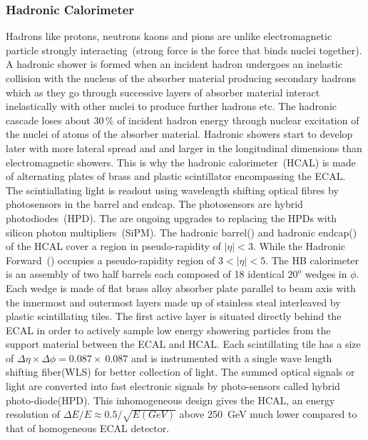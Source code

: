  



\subsubsection{Hadronic Calorimeter}
Hadrons like protons, neutrons kaons and pions are unlike electromagnetic particle strongly interacting~(strong force is the force that binds nuclei together). A hadronic shower is formed when an incident hadron undergoes an inelastic collision with the nucleus of the absorber material producing secondary hadrons which as they go through successive layers of absorber material interact inelastically with other nuclei to produce further hadrons etc. 
The  hadronic cascade loses about 30\,\% of incident hadron energy through nuclear excitation of the nuclei of atoms of the  absorber material.  Hadronic showers start to develop later with more lateral spread and and larger in the longitudinal dimensions than electromagnetic showers. This is why the hadronic calorimeter~(HCAL) is made of alternating plates of brass and plastic scintillator encompassing the ECAL. The scintiallating light is readout using wavelength shifting optical fibres by photosensors in the barrel and endcap. The photosensors are hybrid photodiodes~(HPD). The are ongoing upgrades to replacing the HPDs with silicon photon multipliers~(SiPM). 
The  hadronic barrel() and hadronic endcap() of the HCAL cover a region in pseudo-rapidity of $\vert \eta \vert < 3$. While the Hadronic Forward~() occupies a pseudo-rapidity region of $3 < \vert \eta \vert < 5$.
The HB calorimeter is an assembly of two half barrels each composed of 18 identical $20^{o}$ wedges in $\phi$. Each wedge is made of flat brass alloy absorber plate parallel to beam axis with the innermost and outermost layers made up of stainless steal interleaved by plastic scintillating tiles.
The first active layer is situated directly behind the ECAL in order to actively sample low energy showering particles from the support material between the ECAL and HCAL. Each scintillating tile has a size of $\Delta\eta\times\Delta\phi=0.087 \times\ 0.087$ and is instrumented with a single wave length shifting fiber(WLS) for better collection of light. The summed optical signals or light are converted into fast electronic
signals by photo-sensors called  hybrid photo-diode(HPD).
This inhomogeneous design gives the HCAL, an energy resolution of ${\displaystyle \Delta E/E \approx 0.5/\sqrt{E(GeV)} }$ above 250~GeV  much lower compared to that of homogeneous ECAL detector.

